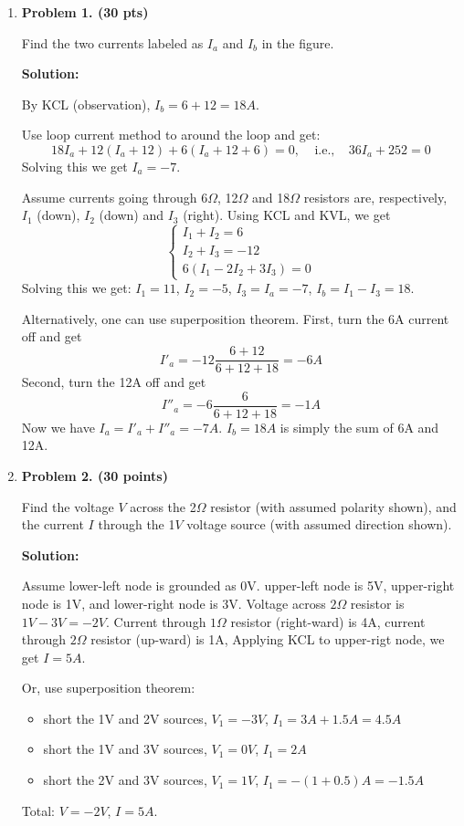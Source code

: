  \begin{enumerate}

 \item {\bf Problem 1. (30 pts)}

   Find the two currents labeled as $I_a$ and $I_b$ in the figure.


   {\bf Solution:}

   By KCL (observation), $I_b=6+12=18A$. 

   Use loop current method to around the loop and get:
   \[ 18I_a+12(I_a+12)+6(I_a+12+6)=0,\;\;\;\;\mbox{i.e.,}\;\;\;\;
   36I_a+252=0 \]
   Solving this we get $I_a=-7$. 

   Assume currents going through 6$\Omega$, 12$\Omega$ and 18$\Omega$
   resistors are, respectively, $I_1$ (down), $I_2$ (down) and $I_3$ 
   (right). Using KCL and KVL, we get
   \[
   \left\{ \begin{array}{l}
     I_1+I_2=6\\I_2+I_3=-12\\6(I_1-2 I_2+3I_3)=0 \end{array} \right. 
   \]
   Solving this we get: $I_1=11$, $I_2=-5$, $I_3=I_a=-7$, $I_b=I_1-I_3=18$.

   Alternatively, one can use superposition theorem. First, turn the 6A current 
   off and get 
   \[
   I'_a=-12 \frac{6+12}{6+12+18}=-6 A 
   \]
   Second, turn the 12A off and get
   \[
   I''_a=-6 \frac{6}{6+12+18}=-1 A 
   \]
   Now we have $I_a=I'_a+I''_a=-7 A$. $I_b=18A$ is simply the sum of 6A and 12A.

\item {\bf Problem 2. (30 points)}

  Find the voltage $V$ across the 2$\Omega$ resistor (with assumed polarity shown),
  and the current $I$ through the 1$V$ voltage source (with assumed direction shown).


  {\bf Solution:}

  Assume lower-left node is grounded as 0V. upper-left node is 5V, upper-right
  node is 1V, and lower-right node is 3V. Voltage across $2\Omega$ resistor is
  $1V-3V=-2V$. Current through $1\Omega$ resistor (right-ward) is 4A, current
  through $2\Omega$ resistor (up-ward) is 1A, Applying KCL to upper-rigt node,
  we get $I=5A$.

  Or, use superposition theorem:
  \begin{itemize}
    \item short the 1V and 2V sources, $V_1=-3V$, $I_1=3A+1.5A=4.5A$
    \item short the 1V and 3V sources, $V_1= 0V$, $I_1=  2A$
    \item short the 2V and 3V sources, $V_1= 1V$, $I_1=-(1+0.5)A=-1.5A$
  \end{itemize}
  Total: $V=-2V$, $I=5A$.


\end{enumerate}
